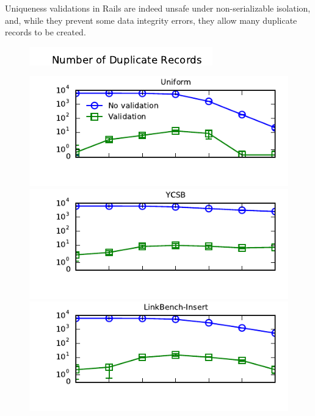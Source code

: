  Uniqueness validations in Rails are indeed unsafe
under non-serializable isolation, and, while they prevent some data
integrity errors, they allow many duplicate records to be created.

\begin{figure}

\begin{minipage}[l]{0cm}
\includegraphics[angle=90, width=.185in]{figs/pk-workload-ylabel.pdf}
\end{minipage}
\begin{minipage}{\columnwidth}
\includegraphics[width=1\columnwidth]{figs/pk-workload-uniform-violations.pdf}\vspace{-2em}
\includegraphics[width=1\columnwidth]{figs/pk-workload-ycsb-violations.pdf}\vspace{-2em}
\includegraphics[width=1\columnwidth]{figs/pk-workload-linkbench-ins-violations.pdf}\vspace{-2em}

\end{minipage}
\end{figure}
